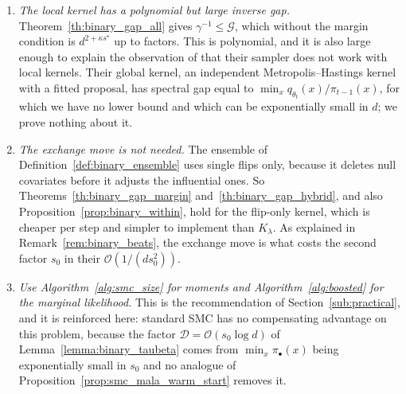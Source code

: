 \documentclass[aos]{imsart}%
\newcommand{\OO}{\mathcal{O}}  %
\theoremstyle{plain}
\theoremstyle{definition}
\begin{document}
\begin{enumerate}[leftmargin=2.2em]
        \item \emph{The local kernel has a polynomial but large inverse gap.}
        Theorem~\ref{th:binary_gap_all} gives $\gamma^{-1}\leq\mathcal G$,
        which without the margin condition is $d^{2+\kappa s^{\star}}$ up to
        factors. This is polynomial, and it is also large enough to explain the
        observation of \citet{Schafer2013-yq} that their sampler does not work
        with local kernels. Their global kernel, an independent
        Metropolis--Hastings kernel with a fitted proposal, has spectral gap
        equal to $\min_x q_{\theta_t}(x)/\pi_{t-1}(x)$, for which we have no
        lower bound and which can be exponentially small in $d$; we prove
        nothing about it.

        \item \emph{The exchange move is not needed.} The ensemble of
        Definition~\ref{def:binary_ensemble} uses single flips only, because it
        deletes null covariates before it adjusts the influential ones. So
        Theorems~\ref{th:binary_gap_margin} and~\ref{th:binary_gap_hybrid}, and
        also Proposition~\ref{prop:binary_within}, hold for the flip-only
        kernel, which is cheaper per step and simpler to implement than
        $K_\lambda$. As explained in Remark~\ref{rem:binary_beats}, the
        exchange move is what costs \citet{YangWainwrightJordan2016} the second
        factor $s_0$ in their $\OO(1/(ds_0^{2}))$.

        \item \emph{Use Algorithm~\ref{alg:smc_size} for moments and
        Algorithm~\ref{alg:boosted} for the marginal likelihood.} This is the
        recommendation of Section~\ref{sub:practical}, and it is reinforced
        here: standard SMC has no compensating advantage on this problem,
        because the factor $\mathcal{D}=\OO(s_0\log d)$ of
        Lemma~\ref{lemma:binary_taubeta} comes from $\min_x\pi_\bullet(x)$
        being exponentially small in $s_0$ and no analogue of
        Proposition~\ref{prop:smc_mala_warm_start} removes it.
    \end{enumerate}


    
    
\end{document}
